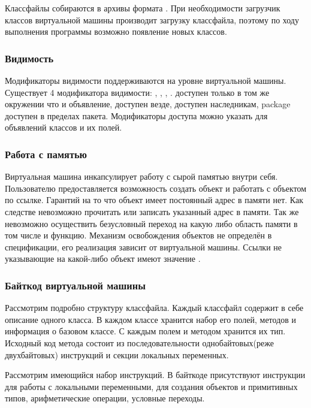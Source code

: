 Классфайлы собираются в архивы формата . При необходимости загрузчик классов виртуальной машины производит загрузку классфайла, поэтому по ходу выполнения программы возможно появление новых классов.

\subsubsection{Видимость}
Модификаторы видимости поддерживаются на уровне виртуальной машины. Существует 4 модификатора видимости: , , , .  доступен только в том же окружении что и объявление,  доступен везде,  доступен наследникам, package доступен в пределах пакета. Модификаторы доступа можно указать для объявлений классов и их полей.

\subsubsection{Работа с памятью}
Виртуальная машина инкапсулирует работу с сырой памятью внутри себя. Пользователю предоставляется возможность создать объект и работать с объектом по ссылке. Гарантий на то что объект имеет постоянный адрес в памяти нет. Как следстве невозможно прочитать или записать указанный адрес в памяти. Так же невозможно осуществить безусловный переход на какую либо область памяти в том числе и функцию. Механизм освобождения объектов не определён в спецификации, его реализация зависит от виртуальной машины. Ссылки не указывающие на какой-либо объект имеют значение .

\subsubsection{Байткод виртуальной машины}
Рассмотрим подробно структуру классфайла. Каждый классфайл содержит в себе описание одного класса. В каждом классе хранится набор его полей, методов и информация о базовом классе. С каждым полем и методом хранится их тип. Исходный код метода состоит из последовательности однобайтовых(реже двухбайтовых) инструкций и секции локальных переменных.

Рассмотрим имеющийся набор инструкций. В байткоде присутствуют инструкции для работы с локальными переменными, для создания объектов и примитивных типов, арифметические операции, условные переходы.

